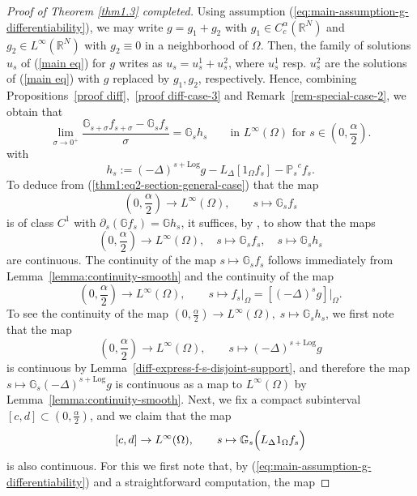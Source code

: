 \documentclass[notitlepage,11pt,reqno]{amsart}
\theoremstyle{definition}
\numberwithin{equation}{section}
\newcommand{\cGs}{{\mathbb G}}
\newcommand{\cPs}{{{\mathbb P}_s}}
\newcommand{\R}{\mathds{R}}
\begin{document}
\begin{proof}[Proof of Theorem \ref{thm1.3} completed]
  Using assumption (\ref{eq:main-assumption-g-differentiability}), we may write
  $g = g_1 + g_2$ with $g_1 \in C^\alpha_c(\R^N)$ and $g_2 \in L^\infty(\R^N)$ with $g_2 \equiv 0$ in a neighborhood of $\Omega$. Then, the family of solutions $u_s$ of (\ref{main eq}) for $g$ writes as $u_s = u_s^1 + u_s^2$, where $u_s^1$ resp. $u_s^2$ are the solutions of (\ref{main eq}) with $g$ replaced by $g_1,g_2$, respectively. Hence, combining Propositions~\ref{proof diff},~\ref{proof diff-case-3} and Remark~\ref{rem-special-case-2}, we obtain that 
    \begin{equation}\label{thm1:eq2-section-general-case}
        \lim_{\sigma \to 0^+} \frac{\cGs_{s+\sigma}f_{s+\sigma}-\cGs_{s} f_s }{\sigma} = \cGs_s h_s  \qquad \text{in $L^\infty(\Omega)$ for $s \in (0,\frac{\alpha}{2})$.}
    \end{equation}
    with
    $$
    h_s := (-\Delta)^{s+\mathrm{Log}}g - L_{\Delta}[1_{\Omega}f_s]- \cPs^{\! \! c} f_s.    $$
    To deduce from (\ref{thm1:eq2-section-general-case}) that the map
    $$
    (0,\frac{\alpha}{2}) \to L^\infty(\Omega), \qquad s \mapsto \cGs_s f_s
    $$
    is of class $C^1$ with $\partial_s (\cGs f_s) = \cGs h_s$, it suffices, by \cite[Lemma 6.6]{JSW20}, to show that the maps
    $$
    (0,\frac{\alpha}{2}) \to L^\infty(\Omega), \quad s \mapsto \cGs_s f_s,\quad  
    s \mapsto \cGs_s h_s
    $$
    are continuous. The continuity of the map $s \mapsto \cGs_s f_s$ follows immediately from Lemma~\ref{lemma:continuity-smooth} and the continuity of the map
    $$
    (0,\frac{\alpha}{2}) \to L^\infty(\Omega), \qquad   s \mapsto f_s \big|_\Omega =  [(-\Delta)^s g]\big|_{\Omega}.
    $$
    To see the continuity of the map $    (0,\frac{\alpha}{2}) \to L^\infty(\Omega),\; s \mapsto \cGs_s h_s$, we first note that the map
    $$
    (0,\frac{\alpha}{2}) \to L^\infty(\Omega), \qquad   s \mapsto (-\Delta)^{s+\mathrm{Log}}g
    $$
    is continuous by Lemma~\ref{diff-express-f-s-disjoint-support}, and therefore the map $s \mapsto \cGs_s (-\Delta)^{s+\mathrm{Log}}g$ is continuous as a map to $L^\infty(\Omega)$ by Lemma~\ref{lemma:continuity-smooth}.
    Next, we fix a compact subinterval $[c,d] \subset (0,\frac{\alpha}{2})$, and we claim that the map
    \begin{equation}
      \label{eq:second-summand}
  [c,d] \to L^\infty(\Omega), \qquad s \mapsto \cGs_s  \Bigl(L_{\Delta}1_{\Omega}f_s\Bigr) 
    \end{equation}
  is also continuous. For this we first note that, by (\ref{eq:main-assumption-g-differentiability}) and a straightforward computation, the map

\end{proof}
\end{document}
